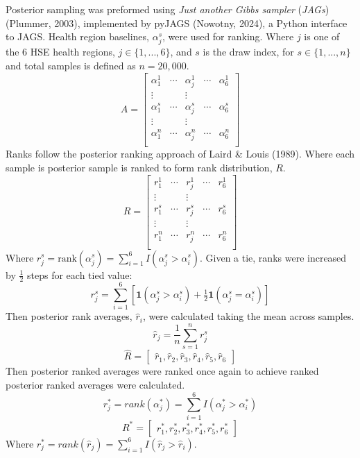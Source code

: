 \documentclass[
]{article}
\begin{document}
Posterior sampling was preformed using \emph{Just another Gibbs sampler} (\emph{JAGs})(Plummer, 2003), implemented by pyJAGS (Nowotny, 2024), a Python interface to JAGS. Health region baselines, \(\alpha^s_j\), were used for ranking. Where \(j\) is one of the 6 HSE health regions, \(j\in\{1,...,6\}\), and \(s\) is the draw index, for \(s\in\{1,...,n\}\) and total samples is defined as \(n=20{,}000\).
\[
  A =
  \left[ {\begin{array}{ccccc}
    \alpha_1^1 & \cdots & \alpha_j^1 & \cdots & \alpha_6^1\\
    \vdots  &        & \vdots\\
    \alpha_1^s & \cdots & \alpha_j^s& \cdots & \alpha_6^s\\
    \vdots  &        & \vdots\\
    \alpha_1^n & \cdots & \alpha_j^n & \cdots & \alpha_6^n\\
  \end{array} } \right]
\]
Ranks follow the posterior ranking approach of Laird \& Louis (1989). Where each sample is posterior sample is ranked to form rank distribution, \(R\).
\[
  R =
  \left[ {\begin{array}{ccccc}
    r_1^1 & \cdots & r_j^1 & \cdots & r_6^1\\
    \vdots  &        & \vdots\\
    r_1^s & \cdots & r_j^s& \cdots & r_6^s\\
    \vdots  &        & \vdots\\
    r_1^n & \cdots & r_j^n & \cdots & r_6^n\\
  \end{array} } \right]
\]
Where \(r_j^s=\text{rank}(\alpha_j^s)=\sum^6_{i=1}I(\alpha_j^s>\alpha_i^s)\). Given a tie, ranks were increased by \(\frac{1}{2}\) steps for each tied value:
\[r^s_j= \sum_{i=1}^{6} \left[ \mathbf{1}(\alpha_j^s > \alpha_i^s) + \tfrac{1}{2}\mathbf{1}(\alpha_j^s = \alpha_i^s) \right]\]
Then posterior rank averages, \(\hat{r}_i\), were calculated taking the mean across samples.
\[\hat{r}_j=\displaystyle \frac{1}{n}\sum^n_{s=1} r_j^s\]
\[
  \hat{R} =
  \left[ {\begin{array}{ccccc}
    \hat{r}_1, \hat{r}_2, \hat{r}_3, \hat{r}_4, \hat{r}_5,  \hat{r}_6
  \end{array} } \right]
\]
Then posterior ranked averages were ranked once again to achieve ranked posterior ranked averages were calculated.
\[
r_j^*=rank(\alpha_j^*)=\sum^6_{i=1}I(\alpha_j^*>\alpha_i^*)
\]
\[
  R^* =
  \left[ {\begin{array}{ccccc}
    r^*_1, r^*_2, r^*_3, r^*_4, r^*_5, r^*_6
  \end{array} } \right]
\]
Where \(r_j^*=rank(\hat{r}_j)=\sum^6_{i=1}I(\hat{r}_j>\hat{r}_i)\).
\end{document}
